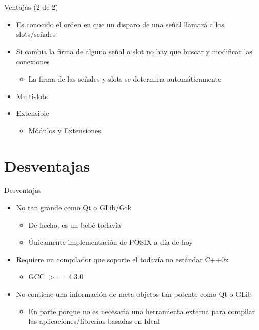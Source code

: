 \documentclass{beamer}
\begin{document}
\begin{frame}{Ventajas (2 de 2)}
  \begin{itemize}
    \item Es conocido el orden en que un disparo de una señal llamará a los slots/señales
    \pause
    \medskip
    \item Si cambia la firma de alguna señal o slot no hay que buscar y modificar las conexiones
    \begin{itemize}
      \item La firma de las señales y slots se determina automáticamente
    \end{itemize}
    \pause
    \medskip
    \item Multislots
    \pause
    \medskip
    \item Extensible
    \begin{itemize}
      \item Módulos y Extensiones
    \end{itemize}
  \end{itemize}
\end{frame}

\section{Desventajas}

\begin{frame}{Desventajas}
  \begin{itemize}
    \item No tan grande como Qt o GLib/Gtk
    \begin{itemize}
      \item De hecho, es un bebé todavía
      \item Únicamente implementación de POSIX a día de hoy
    \end{itemize}
    \pause
    \medskip
    \item Requiere un compilador que soporte el todavía no estándar C++0x
    \begin{itemize}
        \item GCC $>=$ 4.3.0
    \end{itemize}
    \pause
    \medskip
    \item No contiene una información de meta-objetos tan potente como Qt o GLib
    \begin{itemize}
      \item En parte porque no es necesaria una herramienta externa para compilar las aplicaciones/librerías basadas en Ideal
    \end{itemize}
  \end{itemize}
\end{frame}
\end{document}
